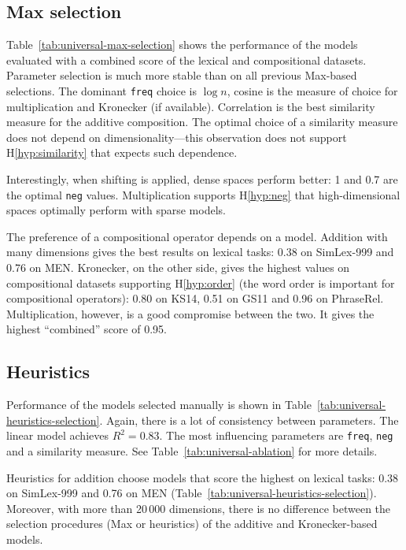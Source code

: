 \subsection{Max selection}
\label{sec:max-selection-universal}

Table~\ref{tab:universal-max-selection} shows the performance of the models evaluated with a combined score of the lexical and compositional datasets.
Parameter selection is much more stable than on all previous Max-based selections. The dominant \texttt{freq} choice is $\log n$, cosine is the measure of choice for multiplication and Kronecker (if available). Correlation is the best similarity measure for the additive composition. The optimal choice of a similarity measure does not depend on dimensionality---this observation does not support H\ref{hyp:similarity} that expects such dependence.

Interestingly, when shifting is applied, dense spaces perform better: 1 and 0.7 are the optimal \texttt{neg} values. Multiplication supports H\ref{hyp:neg} that high-dimensional spaces optimally perform with sparse models.



The preference of a compositional operator depends on a model. Addition with many dimensions gives the best results on lexical tasks: 0.38 on SimLex-999 and 0.76 on MEN. Kronecker, on the other side, gives the highest values on compositional datasets supporting H\ref{hyp:order} (the word order is important for compositional operators): 0.80 on KS14, 0.51 on GS11 and 0.96 on PhraseRel. Multiplication, however, is a good compromise between the two. It gives the highest ``combined'' score of 0.95.

\subsection{Heuristics}
\label{sec:heuristics-universal}

Performance of the models selected manually is shown in Table~\ref{tab:universal-heuristics-selection}. Again, there is a lot of consistency between parameters. The linear model achieves $R^2 = 0.83$. The most influencing parameters are \texttt{freq}, \texttt{neg} and a similarity measure. See Table~\ref{tab:universal-ablation} for more details.

Heuristics for addition choose models that score the highest on lexical tasks: 0.38 on SimLex-999 and 0.76 on MEN (Table~\ref{tab:universal-heuristics-selection}). Moreover, with more than 20\,000 dimensions, there is no difference between the selection procedures (Max or heuristics) of the additive and Kronecker-based models.

